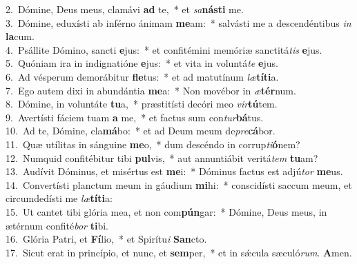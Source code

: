 {2.~}Dómine, Deus meus, clamávi \textbf{ad} te,~* et \textit{sa}\textbf{ná}\textbf{sti} me.\\
{3.~}Dómine, eduxísti ab inférno ánimam \textbf{me}am:~* salvásti me a descendéntibus \textit{in} \textbf{la}cum.\\
{4.~}Psállite Dómino, sancti \textbf{e}jus:~* et confitémini memóriæ sanctitá\textit{tis} \textbf{e}jus.\\
{5.~}Quóniam ira in indignatióne \textbf{e}jus:~* et vita in voluntá\textit{te} \textbf{e}jus.\\
{6.~}Ad vésperum demorábitur \textbf{fle}tus:~* et ad matutínum \textit{læ}\textbf{tí}\textbf{ti}a.\\
{7.~}Ego autem dixi in abundántia \textbf{me}a:~* Non movébor in \textit{æ}\textbf{tér}num.\\
{8.~}Dómine, in voluntáte \textbf{tu}a,~* præstitísti decóri meo \textit{vir}\textbf{tú}tem.\\
{9.~}Avertísti fáciem tuam \textbf{a} me,~* et factus sum con\textit{tur}\textbf{bá}tus.\\
{10.~}Ad te, Dómine, cla\textbf{má}bo:~* et ad Deum meum de\textit{pre}\textbf{cá}bor.\\
{11.~}Quæ utílitas in sánguine \textbf{me}o,~* dum descéndo in corrup\textit{ti}\textbf{ó}nem?\\
{12.~}Numquid confitébitur tibi \textbf{pul}vis,~* aut annuntiábit veritá\textit{tem} \textbf{tu}am?\\
{13.~}Audívit Dóminus, et misértus est \textbf{me}i:~* Dóminus factus est adjú\textit{tor} \textbf{me}us.\\
{14.~}Convertísti planctum meum in gáudium \textbf{mi}hi:~* conscidísti saccum meum, et circumdedísti me \textit{læ}\textbf{tí}\textbf{ti}a:\\
{15.~}Ut cantet tibi glória mea, et non com\textbf{pún}gar:~* Dómine, Deus meus, in ætérnum confité\textit{bor} \textbf{ti}bi.\\
{16.~}Glória Patri, et \textbf{Fí}lio,~* et Spirítu\textit{i} \textbf{San}cto.\\
{17.~}Sicut erat in princípio, et nunc, et \textbf{sem}per,~* et in sǽcula sæculó\textit{rum}. \textbf{A}men.\\
